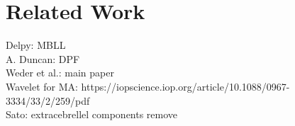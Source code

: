 \chapter{Related Work}
Delpy: MBLL \\
A. Duncan: DPF \\
Weder et al.: main paper \\
Wavelet for MA: https://iopscience.iop.org/article/10.1088/0967-3334/33/2/259/pdf \\
Sato: extracebrellel components remove\\ 